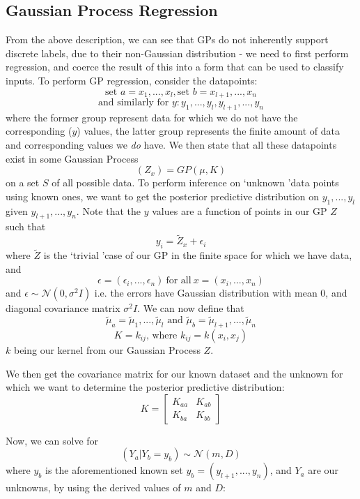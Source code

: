 \documentclass[journal]{IEEEtran}
\begin{document}
    \subsection{Gaussian Process Regression} From the above description, we can see that GPs do not inherently support discrete labels, due to their non-Gaussian distribution - we need to first perform regression, and coerce the result of this into a form that can be used to classify inputs. To perform GP regression, consider the datapoints:
    $$ \textrm{set } a = x_1, ... , x_l, \textrm{set } b = x_{l+1}, ... , x_n $$
    $$ \textrm{and similarly for } y: y_1, ... , y_l, y_{l+1}, ... , y_n $$
    where the former group represent data for which we do not have the corresponding ($y$) values, the latter group represents the finite amount of data and corresponding values we \textit{do} have. We then state that all these datapoints exist in some Gaussian Process $$ (Z_x) = GP(\mu, K) $$ on a set $S$ of all possible data. To perform inference on \lq unknown \rq data points using known ones, we want to get the posterior predictive distribution on $y_1, ... , y_l$ given $y_{l+1}, ... , y_n$. Note that the $y$ values are a function of points in our GP $Z$ such that $$y_i = \widetilde{Z}_x + \epsilon_i$$ where $\widetilde{Z}$ is the \lq trivial \rq case of our GP in the finite space for which we have data, and $$\epsilon = (\epsilon_i, ... , \epsilon_n) \ \textrm{for all} \ x = (x_i, ... , x_n)$$ and $\epsilon \sim \mathcal{N}(0, \sigma^2I)$ i.e. the errors have Gaussian distribution with mean 0, and diagonal covariance matrix $\sigma^2I$. We can now define that $$\widetilde{\mu}_{a} = \widetilde{\mu}_{1} ,..., \widetilde{\mu}_{l} \textrm{ and } \widetilde{\mu}_{b} = \widetilde{\mu}_{l+1} ,..., \widetilde{\mu}_{n}$$ 
    $$ K = k_{ij} \textrm{, where } k_{ij} = k(x_i, x_j) $$
    $k$ being our kernel from our Gaussian Process $Z$. 

    We then get the covariance matrix for our known dataset and the unknown for which we want to determine the posterior predictive distribution:
    $$ K = 
    \begin{bmatrix}
        K_{aa} & K_{ab} \\
        K_{ba} & K_{bb} 
    \end{bmatrix}
    $$

    Now, we can solve for $$(Y_a | Y_b = y_b) \sim \mathcal{N}(m, D)$$
    where $y_b$ is the aforementioned known set $y_b = (y_{l+1}, ... , y_{n})$, and $Y_a$ are our unknowns, by using the derived values of $m$ and $D$:
\end{document}
